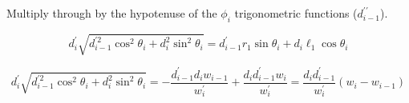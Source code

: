 \documentclass{article}
\begin{document}
%
%
%
%
%
%
%
%
%
%

Multiply through by the hypotenuse of the $\phi_i$ trigonometric functions ($d_{i-1}^{\prime\prime}$).

$$
d_i^\prime
\sqrt{d_{i-1}^{\prime2} \cos^2 \theta_i + d_i^2 \sin^2 \theta_i}
=
d_{i-1}^\prime r_1 \sin\theta_i + d_i \ell_1 \cos\theta_i
$$

$$
d_i^\prime
\sqrt{d_{i-1}^{\prime2} \cos^2 \theta_i + d_i^2 \sin^2 \theta_i}
=
-\frac{d_{i-1}^\prime d_i w_{i-1}}{w_i^\prime}
+
\frac{d_i d_{i-1}^\prime w_i}{w_i^\prime}
=
\frac{d_i d_{i-1}^\prime}{w_i^\prime} (w_i - w_{i-1})
$$
\end{document}
